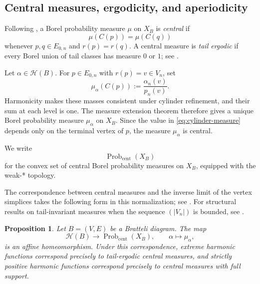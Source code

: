 \documentclass[11pt]{amsart}
\newtheorem{proposition}[theorem]{Proposition}
\theoremstyle{definition}
\theoremstyle{remark}
\begin{document}
\subsection{Central measures, ergodicity, and aperiodicity}
\label{subsec:central-measures}

Following \cite[Section~2.3, Definition~1]{Vershik2014},
a Borel probability measure $\mu$ on $X_B$ is \emph{central} if
\[
 \mu(C(p))=\mu(C(q))
\]
whenever $p,q\in E_{0,n}$ and $r(p)=r(q)$.
A central measure is \emph{tail ergodic} if every Borel union of tail classes
has measure $0$ or $1$; see \cite[Section~2.3]{Vershik2014}.

\medskip
Let $\alpha\in\mathcal H(B)$.
For $p\in E_{0,n}$ with $r(p)=v\in V_n$, set
\begin{equation}\label{eq:cylinder-measure}
 \mu_\alpha(C(p))
 :=\frac{\alpha_n(v)}{p_n(v)}.
\end{equation}
Harmonicity makes these masses consistent under cylinder refinement,
and their sum at each level is one.  The measure extension theorem
therefore gives a unique Borel probability measure $\mu_\alpha$ on $X_B$.
Since the value in \eqref{eq:cylinder-measure} depends only on the terminal
vertex of $p$, the measure $\mu_\alpha$ is central.

We write
\[
 \operatorname{Prob}_{\mathrm{cent}}(X_B)
\]
for the convex set of central Borel probability measures on $X_B$, equipped
with the weak-* topology.

The correspondence between central measures and the inverse limit of
the vertex simplices takes the following form in this normalization;
see \cite[Proposition~1 and the discussion following it]{Vershik2014}.
For structural results on tail-invariant measures when the sequence
$(|V_n|)$ is bounded, see \cite{BezuglyiKwiatkowskiMedynetsSolomyak2013}.

\begin{proposition}
\label{prop:harmonic-central-measure}
Let $B=(V,E)$ be a Bratteli diagram.
The map
\[
 \mathcal H(B)\longrightarrow
 \operatorname{Prob}_{\mathrm{cent}}(X_B),
 \qquad
 \alpha\longmapsto\mu_\alpha,
\]
is an affine homeomorphism.
Under this correspondence, extreme harmonic functions correspond precisely to
tail-ergodic central measures, and strictly positive harmonic functions
correspond precisely to central measures with full support.
\end{proposition}
\end{document}

